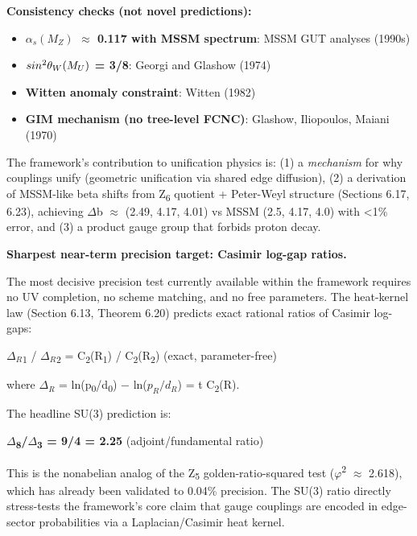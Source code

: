 \documentclass[11pt,a4paper]{article}
\theoremstyle{remark}
\providecommand{\tightlist}{%
  \setlength{\itemsep}{0pt}\setlength{\parskip}{0pt}}
\begin{document}
\textbf{Consistency checks (not novel predictions):}

\begin{itemize}
\tightlist
\item
  \textbf{\(\ensuremath{\alpha}_s(M_Z)\) \ensuremath{\approx} 0.117 with MSSM spectrum}: MSSM GUT analyses (1990s)
\item
  \textbf{\(sin\textsuperscript{2}\ensuremath{\theta}_W(M_U)\) = 3/8}: Georgi and Glashow (1974)
\item
  \textbf{Witten anomaly constraint}: Witten (1982)
\item
  \textbf{GIM mechanism (no tree-level FCNC)}: Glashow, Iliopoulos, Maiani (1970)
\end{itemize}

The framework's contribution to unification physics is: (1) a \emph{mechanism} for
why couplings unify (geometric unification via shared edge diffusion), (2) a
derivation of MSSM-like beta shifts from Z\textsubscript{6} quotient + Peter-Weyl structure
(Sections 6.17, 6.23), achieving \ensuremath{\Delta}b \ensuremath{\approx} (2.49, 4.17, 4.01) vs MSSM (2.5, 4.17, 4.0)
with \textless1\% error, and (3) a product gauge group that forbids proton decay.

\textbf{Sharpest near-term precision target: Casimir log-gap ratios.}

The most decisive precision test currently available within the framework requires no UV completion, no scheme matching, and no free parameters. The heat-kernel law (Section 6.13, Theorem 6.20) predicts exact rational ratios of Casimir log-gaps:

\(\ensuremath{\Delta}_R\)\textsubscript{1} / \(\ensuremath{\Delta}_R\)\textsubscript{2} = C\textsubscript{2}(R\textsubscript{1}) / C\textsubscript{2}(R\textsubscript{2}) (exact, parameter-free)

where \(\ensuremath{\Delta}_R\) = ln(p\textsubscript{0}/d\textsubscript{0}) \ensuremath{-} ln(\(p_R/d_R\)) = t C\textsubscript{2}(R).

The headline SU(3) prediction is:

\textbf{\ensuremath{\Delta}\textsubscript{8}/\ensuremath{\Delta}\textsubscript{3} = 9/4 = 2.25} (adjoint/fundamental ratio)

This is the nonabelian analog of the Z\textsubscript{5} golden-ratio-squared test
(\ensuremath{\varphi}\textsuperscript{2} \ensuremath{\approx} 2.618), which has already been validated to 0.04\% precision.
The SU(3) ratio directly stress-tests the framework's core claim that gauge
couplings are encoded in edge-sector probabilities via a Laplacian/Casimir
heat kernel.
\end{document}
